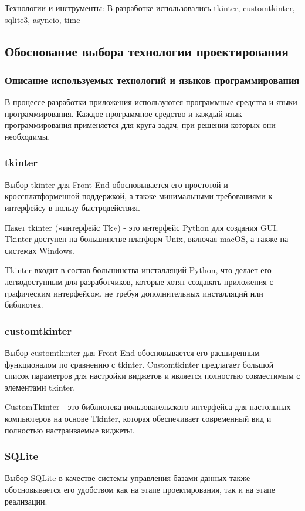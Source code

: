 Технологии и инструменты: В разработке использовались tkinter, customtkinter, sqlite3, asyncio, time

\subsection{Обоснование выбора технологии проектирования}

\subsubsection{Описание используемых технологий и языков программирования}

В процессе разработки приложения используются программные средства и языки программирования. Каждое программное средство и каждый язык программирования применяется для круга задач, при решении которых они необходимы.

\subsubsection {tkinter}
Выбор tkinter для Front-End обосновывается его простотой и кроссплатформенной поддержкой, а также минимальными требованиями к интерфейсу в пользу быстродействия. 

Пакет tkinter («интерфейс Tk») - это интерфейс Python для создания GUI. Tkinter доступен на большинстве платформ Unix, включая macOS, а также на системах Windows.

Tkinter входит в состав большинства инсталляций Python, что делает его легкодоступным для разработчиков, которые хотят создавать приложения с графическим интерфейсом, не требуя дополнительных инсталляций или библиотек.

\subsubsection {customtkinter}
Выбор customtkinter для Front-End обосновывается его расширенным функционалом по сравнению с tkinter. Customtkinter предлагает большой список параметров для настройки виджетов и является полностью совместимым с элементами tkinter.

CustomTkinter - это библиотека пользовательского интерфейса для настольных компьютеров на основе Tkinter, которая обеспечивает современный вид и полностью настраиваемые виджеты.

\subsubsection {SQLite}
Выбор SQLite в качестве системы управления базами данных также обосновывается его удобством как на этапе проектирования, так и на этапе реализации.

